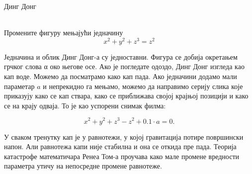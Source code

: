 \documentclass[en]{./../../common/SurferDesc}%
\begin{document}
\footnotesize

\begin{surferPage}
  \begin{surferTitle}Динг Донг\end{surferTitle}  \\
Промените фигуру мењајући једначину\\

\smallskip
\[x^2	+ y^2	+ z^3	= z^2\]

\singlespacing
Једначина и облик Динг Донг-а су једноставни. Фигура се добија окретањем грчког слова α око његове осе. Ако је погледате одоздо, Динг Донг изгледа као кап воде. Можемо да посматрамо како кап пада.
\newline
Ако једначини додамо мали параметар $a$ и непрекидно га мењамо, можемо да направимо серију слика које приказују како се кап ствара, како се приближава својој крајњој позицији и како се на крају одваја. То је као успорени снимак филма:

\[x^2	+ y^2	+ z^3	-z^2+0.1\cdot a=0.\]

У сваком тренутку кап је у равнотежи, у којој гравитација потире површински напон. Али равнотежа капи није стабилна и она се откида пре пада. Теорија катастрофе математичара Ренеа Том-а проучава како мале промене вредности параметра утичу на непосредне промене равнотеже. 



  \begin{surferText}
     \end{surferText}
\end{surferPage}


\end{document}
